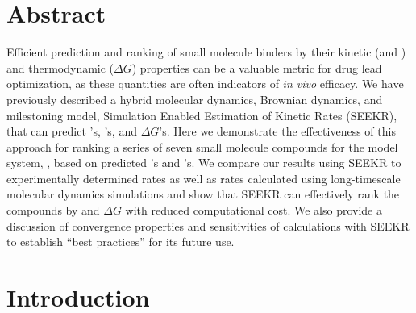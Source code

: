 \section{Abstract}

Efficient prediction and ranking of small molecule binders by their kinetic (\kon and \koff) and thermodynamic ($\Delta G$) properties can be a valuable metric for
drug lead optimization, as these quantities are often indicators of \textit{in vivo} efficacy.
We have
previously described a hybrid molecular dynamics, Brownian dynamics, and milestoning model, Simulation Enabled Estimation of Kinetic
Rates (SEEKR), that can predict \kon's, \koff's, and $\Delta G$'s. Here we demonstrate the effectiveness of this approach for ranking a
series of seven small molecule compounds for the model system, \bcd, based on predicted \kon's and \koff's. We compare our results using
SEEKR to experimentally determined rates as well as rates calculated using long-timescale molecular dynamics simulations and show that
SEEKR can effectively rank the compounds by \koff and $\Delta G$ with reduced computational cost. We also provide a discussion of
convergence properties and sensitivities of calculations with SEEKR to establish ``best practices'' for its future use.

\section{Introduction}

